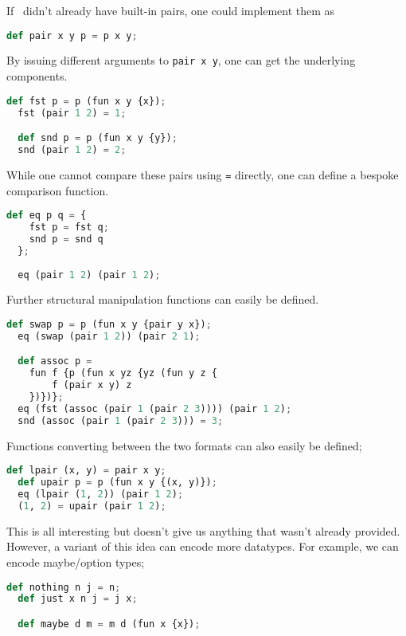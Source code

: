 If \vampir\ didn't already have built-in pairs, one could implement them as

\begin{lstlisting}[language=Python]
  def pair x y p = p x y;
\end{lstlisting}

By issuing different arguments to \lstinline|pair x y|, one can get the underlying components.

\begin{lstlisting}[language=Python]
  def fst p = p (fun x y {x});
  fst (pair 1 2) = 1;

  def snd p = p (fun x y {y});
  snd (pair 1 2) = 2;
\end{lstlisting}

While one cannot compare these pairs using \lstinline|=| directly, one can define a bespoke comparison function.

\begin{lstlisting}[language=Python]
  def eq p q = {
    fst p = fst q; 
    snd p = snd q
  };
  
  eq (pair 1 2) (pair 1 2);
\end{lstlisting}

Further structural manipulation functions can easily be defined.

\begin{lstlisting}[language=Python]
  def swap p = p (fun x y {pair y x});
  eq (swap (pair 1 2)) (pair 2 1);

  def assoc p = 
    fun f {p (fun x yz {yz (fun y z {
        f (pair x y) z
    })})};
  eq (fst (assoc (pair 1 (pair 2 3)))) (pair 1 2);
  snd (assoc (pair 1 (pair 2 3))) = 3;
\end{lstlisting}

Functions converting between the two formats can also easily be defined;

\begin{lstlisting}[language=Python]
  def lpair (x, y) = pair x y;
  def upair p = p (fun x y {(x, y)});
  eq (lpair (1, 2)) (pair 1 2);
  (1, 2) = upair (pair 1 2);
\end{lstlisting}

This is all interesting but doesn't give us anything that wasn't already provided. However, a variant of this idea can encode more datatypes. For example, we can encode maybe/option types;

\begin{lstlisting}[language=Python]
  def nothing n j = n;
  def just x n j = j x;

  def maybe d m = m d (fun x {x});
\end{lstlisting}

